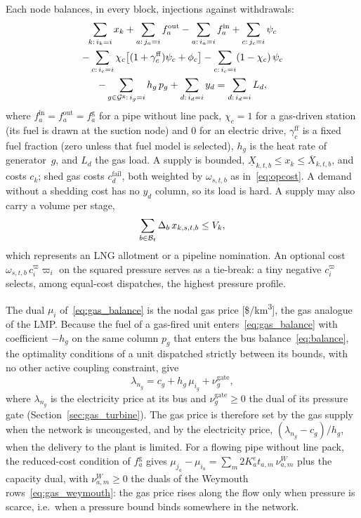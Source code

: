 Each node balances, in every block, injections against withdrawals:
\begin{multline}
\label{eq:gas_balance}
\sum_{k:\,i_k=i} x_k
+ \sum_{a:\,j_a=i} f^{\mathrm{out}}_a
- \sum_{a:\,i_a=i} f^{\mathrm{in}}_a
+ \sum_{c:\,j_c=i} \psi_c \\
- \sum_{c:\,i_c=i} \chi_c \bigl[(1+\gamma^{\mathrm{ff}}_c)\psi_c
  + \phi_c\bigr]
- \sum_{c:\,i_c=i} (1-\chi_c)\,\psi_c \\
- \sum_{g\in\mathcal{G}^{\mathrm{g}}:\,i_g=i} h_g\, p_g
+ \sum_{d:\,i_d=i} y_d
= \sum_{d:\,i_d=i} L_d ,
\end{multline}
where $f^{\mathrm{in}}_a = f^{\mathrm{out}}_a = f^{\mathrm{g}}_a$ for a
pipe without line pack, $\chi_c = 1$ for a gas-driven station (its fuel
is drawn at the suction node) and $0$ for an electric drive,
$\gamma^{\mathrm{ff}}_c$ is a fixed fuel fraction (zero unless that fuel
model is selected), $h_g$ is the heat rate of generator~$g$, and $L_d$
the gas load.  A supply is bounded,
$\underline{X}_{k,t,b} \leq x_k \leq \overline{X}_{k,t,b}$, and costs
$c_k$; shed gas costs $c^{\mathrm{fail}}_d$, both weighted by
$\omega_{s,t,b}$ as in~\eqref{eq:opcost}.  A demand without a shedding
cost has no $y_d$ column, so its load is hard.  A supply may also carry
a volume per stage,
\begin{equation}
\label{eq:gas_volume}
\sum_{b \in \mathcal{B}_t} \Delta_b\, x_{k,s,t,b} \le V_k,
\end{equation}
which represents an LNG allotment or a pipeline nomination.  An
optional cost $\omega_{s,t,b}\, c^{\varpi}_i \varpi_i$ on the squared
pressure serves as a tie-break: a tiny negative $c^{\varpi}_i$ selects,
among equal-cost dispatches, the highest pressure profile.

The dual $\mu_i$ of~\eqref{eq:gas_balance} is the nodal gas price
[\$/km\textsuperscript{3}], the gas analogue of the LMP.  Because the
fuel of a gas-fired unit enters~\eqref{eq:gas_balance} with coefficient
$-h_g$ on the same column $p_g$ that enters the bus
balance~\eqref{eq:balance}, the optimality conditions of a unit
dispatched strictly between its bounds, with no other active coupling
constraint, give
\begin{equation}
\label{eq:gas_price_link}
\lambda_{n_g} = c_g + h_g\, \mu_{i_g} + \nu^{\mathrm{gate}}_g ,
\end{equation}
where $\lambda_{n_g}$ is the electricity price at its bus and
$\nu^{\mathrm{gate}}_g \geq 0$ the dual of its pressure gate
(Section~\ref{sec:gas_turbine}).  The gas price is therefore set by the
gas supply when the network is uncongested, and by the electricity
price, $(\lambda_{n_g} - c_g)/h_g$, when the delivery to the plant is
limited.  For a flowing pipe without line pack, the reduced-cost
condition of $f^{\mathrm{g}}_a$ gives
$\mu_{j_a} - \mu_{i_a} = \sum_m 2K^e_a t_{a,m}\, \nu^{W}_{a,m}$ plus the
capacity dual, with $\nu^{W}_{a,m} \geq 0$ the duals of the Weymouth
rows~\eqref{eq:gas_weymouth}: the gas price rises along the flow only
when pressure is scarce, i.e.\ when a pressure bound binds somewhere
in the network.

